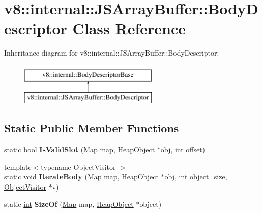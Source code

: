 \hypertarget{classv8_1_1internal_1_1JSArrayBuffer_1_1BodyDescriptor}{}\section{v8\+:\+:internal\+:\+:J\+S\+Array\+Buffer\+:\+:Body\+Descriptor Class Reference}
\label{classv8_1_1internal_1_1JSArrayBuffer_1_1BodyDescriptor}
Inheritance diagram for v8\+:\+:internal\+:\+:J\+S\+Array\+Buffer\+:\+:Body\+Descriptor\+:\begin{figure}[H]
\begin{center}
\leavevmode
\includegraphics[height=2.000000cm]{classv8_1_1internal_1_1JSArrayBuffer_1_1BodyDescriptor}
\end{center}
\end{figure}
\subsection*{Static Public Member Functions}
\begin{DoxyCompactItemize}
\item 
\mbox{\label{classv8_1_1internal_1_1JSArrayBuffer_1_1BodyDescriptor_a38e2ef607b36ca84df20baf4164bc362}} 
static \mbox{\hyperlink{classbool}{bool}} {\bfseries Is\+Valid\+Slot} (\mbox{\hyperlink{classv8_1_1internal_1_1Map}{Map}} map, \mbox{\hyperlink{classv8_1_1internal_1_1HeapObject}{Heap\+Object}} $\ast$obj, \mbox{\hyperlink{classint}{int}} offset)
\item 
\mbox{\label{classv8_1_1internal_1_1JSArrayBuffer_1_1BodyDescriptor_a5664de7a301a0683aea5f1bc2f9db1a0}} 
{\footnotesize template$<$typename Object\+Visitor $>$ }\\static void {\bfseries Iterate\+Body} (\mbox{\hyperlink{classv8_1_1internal_1_1Map}{Map}} map, \mbox{\hyperlink{classv8_1_1internal_1_1HeapObject}{Heap\+Object}} $\ast$obj, \mbox{\hyperlink{classint}{int}} object\+\_\+size, \mbox{\hyperlink{classv8_1_1internal_1_1ObjectVisitor}{Object\+Visitor}} $\ast$v)
\item 
\mbox{\label{classv8_1_1internal_1_1JSArrayBuffer_1_1BodyDescriptor_a081b64d2875bb115e1f5d4855cdbd902}} 
static \mbox{\hyperlink{classint}{int}} {\bfseries Size\+Of} (\mbox{\hyperlink{classv8_1_1internal_1_1Map}{Map}} map, \mbox{\hyperlink{classv8_1_1internal_1_1HeapObject}{Heap\+Object}} $\ast$object)
\end{DoxyCompactItemize}
